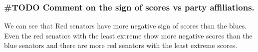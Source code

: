 \documentclass[11pt]{article}
\begin{document}
    \hypertarget{todo-comment-on-the-sign-of-scores-vs-party-affiliations.}{%
\subsubsection{\#TODO Comment on the sign of scores vs party
affiliations.}\label{todo-comment-on-the-sign-of-scores-vs-party-affiliations.}}

    We can see that Red senators have more negative sign of scores than the
blues. Even the red senators with the least extreme show more negative
scores than the blue senators and there are more red senators with the
least extreme scores.


    
    
    
    
\end{document}
